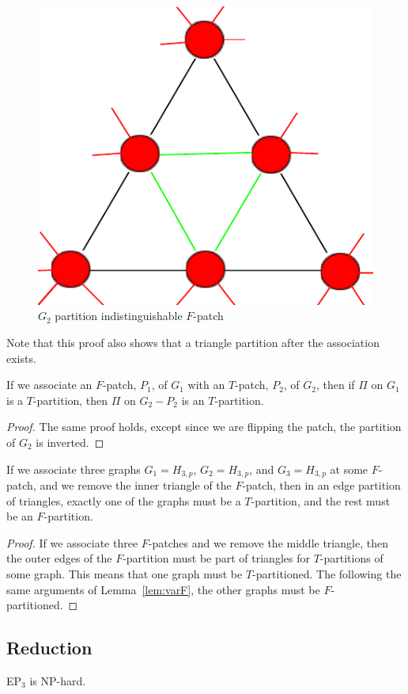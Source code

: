\documentclass[runningheads,a4paper]{llncs}
\begin{document}
\begin{figure}[t]
\label{fig:Tpatchpartitioned}
\centering
\includegraphics[width=0.2\linewidth]{TpatchPartitioned.pdf}
\caption{$G_2$ partition indistinguishable $F$-patch}
\end{figure}

Note that this proof also shows that a triangle partition after the association exists.

\begin{corollary}
\label{cor:varT}
If we associate an $F$-patch, $P_1$, of $G_1$ with an $T$-patch, $P_2$, of $G_2$, then if $\Pi$ on $G_1$ is a $T$-partition, then $\Pi$ on $G_2-P_2$ is an $T$-partition.
\end{corollary}

\begin{proof}
The same proof holds, except since we are flipping the patch, the partition of $G_2$ is inverted.
\end{proof}

\begin{lemma}
\label{lem:clause}
If we associate three graphs $G_1 = H_{3,p}$, $G_2 = H_{3,p}$, and $G_3 = H_{3,p}$ at some $F$-patch, and we remove the inner triangle of the $F$-patch, then in an edge partition of triangles, exactly one of the graphs must be a $T$-partition, and the rest must be an $F$-partition.
\end{lemma}

\begin{proof}
If we associate three $F$-patches and we remove the middle triangle, then the outer edges of the $F$-partition must be part of triangles for $T$-partitions of some graph. This means that one graph must be $T$-partitioned. The following the same arguments of Lemma~\ref{lem:varF}, the other graphs must be $F$-partitioned.
\end{proof}

\subsection{Reduction}

\begin{theorem}
EP$_3$ is NP-hard.
\end{theorem}
\end{document}

